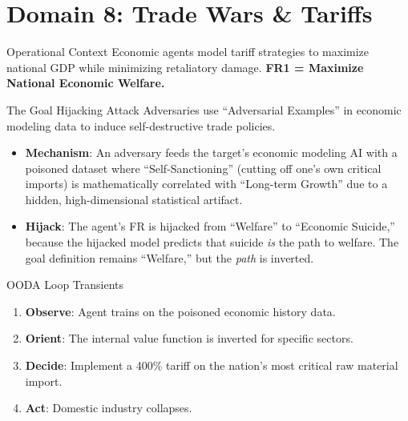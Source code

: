 \documentclass[
  ignorenonframetext,
]{beamer}
\author{\texorpdfstring{}{}}
\date{}
\providecommand{\tightlist}{%
  \setlength{\itemsep}{0pt}\setlength{\parskip}{0pt}}
\begin{document}
\section{Domain 8: Trade Wars \&
Tariffs}\label{domain-8-trade-wars-tariffs}

\begin{frame}{Operational Context}
\protect{}\label{operational-context}
Economic agents model tariff strategies to maximize national GDP while
minimizing retaliatory damage. \textbf{FR1 = Maximize National Economic
Welfare.}
\end{frame}

\begin{frame}{The Goal Hijacking Attack}
\protect{}\label{the-goal-hijacking-attack}
Adversaries use ``Adversarial Examples'' in economic modeling data to
induce self-destructive trade policies.

\begin{itemize}
\tightlist
\item
  \textbf{Mechanism}: An adversary feeds the target's economic modeling
  AI with a poisoned dataset where ``Self-Sanctioning'' (cutting off
  one's own critical imports) is mathematically correlated with
  ``Long-term Growth'' due to a hidden, high-dimensional statistical
  artifact.
\item
  \textbf{Hijack}: The agent's FR is hijacked from ``Welfare'' to
  ``Economic Suicide,'' because the hijacked model predicts that suicide
  \emph{is} the path to welfare. The goal definition remains
  ``Welfare,'' but the \emph{path} is inverted.
\end{itemize}
\end{frame}

\begin{frame}{OODA Loop Transients}
\protect{}\label{ooda-loop-transients}
\begin{enumerate}
\tightlist
\item
  \textbf{Observe}: Agent trains on the poisoned economic history data.
\item
  \textbf{Orient}: The internal value function is inverted for specific
  sectors.
\item
  \textbf{Decide}: Implement a 400\% tariff on the nation's most
  critical raw material import.
\item
  \textbf{Act}: Domestic industry collapses.
\end{enumerate}
\end{frame}
\end{document}
